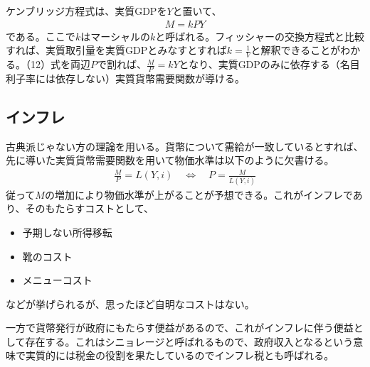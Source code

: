 \documentclass{jsarticle}
\begin{document}
ケンブリッジ方程式は、実質GDPを$Y$と置いて、
\begin{align}
	M = kPY
\end{align}
である。ここで$k$はマーシャルの$k$と呼ばれる。フィッシャーの交換方程式と比較すれば、実質取引量を実質GDPとみなすとすれば$k = \frac{1}{V}$と解釈できることがわかる。（12）式を両辺$P$で割れば、$\frac{M}{P} = kY$となり、実質GDPのみに依存する（名目利子率には依存しない）実質貨幣需要関数が導ける。

\subsection{インフレ}
古典派じゃない方の理論を用いる。貨幣について需給が一致しているとすれば、先に導いた実質貨幣需要関数を用いて物価水準は以下のように欠書ける。
\begin{align*}
	\frac{M}{P} = L(Y, i)\quad \Leftrightarrow\quad P = \frac{M}{L(Y, i)}
\end{align*}
従って$M$の増加により物価水準が上がることが予想できる。これがインフレであり、そのもたらすコストとして、
\begin{itemize}
\item 予期しない所得移転
\item 靴のコスト
\item メニューコスト
\end{itemize}
などが挙げられるが、思ったほど自明なコストはない。

一方で貨幣発行が政府にもたらす便益があるので、これがインフレに伴う便益として存在する。これはシニョレージと呼ばれるもので、政府収入となるという意味で実質的には税金の役割を果たしているのでインフレ税とも呼ばれる。
\end{document}
